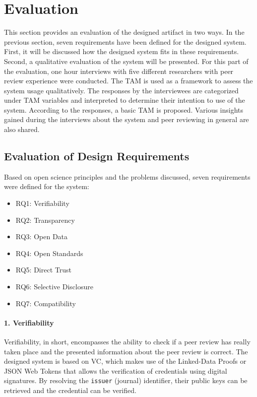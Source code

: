
\chapter{Evaluation}\label{chapter:evaluation}

This section provides an evaluation of the designed artifact in two ways. In the previous section, seven requirements have been defined for the designed system. First, it will be discussed how the designed system fits in these requirements. Second, a qualitative evaluation of the system will be presented. For this part of the evaluation, one hour interviews with five different researchers with peer review experience were conducted. The \acrfull{TAM} is used as a framework to assess the system usage qualitatively. The responses by the interviewees are categorized under \acrshort{TAM} variables and interpreted to determine their intention to use of the system. According to the responses, a basic \acrlong{TAM} is proposed. Various insights gained during the interviews about the system and peer reviewing in general are also shared.

\section{Evaluation of Design Requirements}

Based on open science principles and the problems discussed, seven requirements were defined for the system:

\begin{itemize}
  \item RQ1: Verifiability 
  \item RQ2: Transparency 
  \item RQ3: Open Data 
  \item RQ4: Open Standards 
  \item RQ5: Direct Trust 
  \item RQ6: Selective Disclosure 
  \item RQ7: Compatibility 
\end{itemize}

\subsubsection{1. Verifiability}

Verifiability, in short, encompasses the ability to check if a peer review has really taken place and the presented information about the peer review is correct. The designed system is based on \acrlong{VC}, which makes use of the Linked-Data Proofs or \acrshort{JSON} Web Tokens that allows the verification of credentials using digital signatures. By resolving the \lstinline{issuer} (journal) identifier, their public keys can be retrieved and the credential can be verified. 

